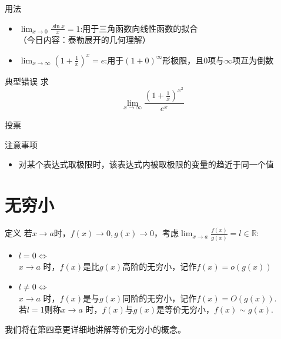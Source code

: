 \documentclass[]{beamer}
\begin{document}
\begin{frame}{用法}
    \begin{itemize}
        \item $\displaystyle\lim_{x\rightarrow0}\frac{\sin x}{x}=1$:用于三角函数向线性函数的拟合\\ \vspace{5pt}
        （今日内容：泰勒展开的几何理解）
        \item $\displaystyle\lim_{x\rightarrow\infty}(1+\frac1x)^x=e$:用于$(1+0)^\infty$形极限，且$0$项与$\infty$项互为倒数
    \end{itemize}
\end{frame}


\begin{frame}{典型错误}
    求
    \[
    \lim_{x\rightarrow\infty}\frac{(1+\frac1x)^{x^2}}{e^x}
    \]
\end{frame}

\begin{frame}{投票}

\end{frame}

\begin{frame}{注意事项}
    \begin{itemize}
        \item 对某个表达式取极限时，该表达式内被取极限的变量的趋近于同一个值
    \end{itemize}
\end{frame}

\section{无穷小}

\begin{frame}{定义}
    若$x\rightarrow a$时，$f(x)\rightarrow 0, g(x)\rightarrow 0$，考虑$\displaystyle\lim_{x\rightarrow a}\frac{f(x)}{g(x)}=l\in\mathbb R$:
    \begin{itemize}
        \item $l=0\Leftrightarrow$\\$x\rightarrow a\text{ 时，} f(x)$是比$g(x)$高阶的无穷小，记作$f(x)=o(g(x))$
        \item $l\ne0\Leftrightarrow$\\$x\rightarrow a\text{ 时，} f(x)$是与$g(x)$同阶的无穷小，记作$f(x)=O(g(x))$.\\
        若$l=1$则称$x\rightarrow a\text{ 时，}f(x)$与$g(x)$是等价无穷小，$f(x)\sim g(x)$.
    \end{itemize}
    \vspace{5pt}
    我们将在第四章更详细地讲解等价无穷小的概念。
\end{frame}
\end{document}
